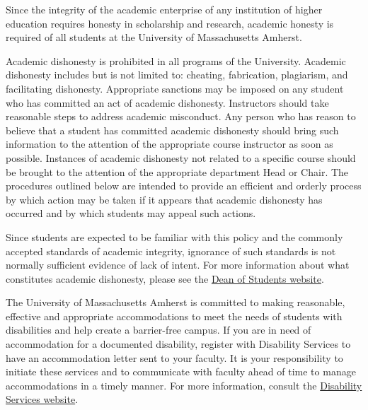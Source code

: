 \documentclass[10pt]{article}
\begin{document}
{\footnotesize 
  
\bigskip
{}
Since the integrity of the academic enterprise of any institution of higher education requires honesty in scholarship and research, academic honesty is required of all students at the University of Massachusetts Amherst.

Academic dishonesty is prohibited in all programs of the University. Academic dishonesty includes but is not limited to: cheating, fabrication, plagiarism, and facilitating dishonesty. Appropriate sanctions may be imposed on any student who has committed an act of academic dishonesty. Instructors should take reasonable steps to address academic misconduct. Any person who has reason to believe that a student has committed academic dishonesty should bring such information to the attention of the appropriate course instructor as soon as possible. Instances of academic dishonesty not related to a specific course should be brought to the attention of the appropriate department Head or Chair. The procedures outlined below are intended to provide an efficient and orderly process by which action may be taken if it appears that academic dishonesty has occurred and by which students may appeal such actions.

Since students are expected to be familiar with this policy and the commonly accepted standards of academic integrity, ignorance of such standards is not normally sufficient evidence of lack of intent.
For more information about what constitutes academic dishonesty, please see the \href{http://umass.edu/dean_students/codeofconduct/acadhonesty/}{Dean of Students website}.

}

{\footnotesize 
\bigskip
{}
The University of Massachusetts Amherst is committed to making reasonable, effective and appropriate accommodations to meet the needs of students with disabilities and help create a barrier-free campus. If you are in need of accommodation for a documented disability, register with Disability Services to have an accommodation letter sent to your faculty. It is your responsibility to initiate these services and to communicate with faculty ahead of time to manage accommodations in a timely manner. For more information, consult the \href{http://www.umass.edu/disability/}{Disability Services website}.
}
\end{document}
